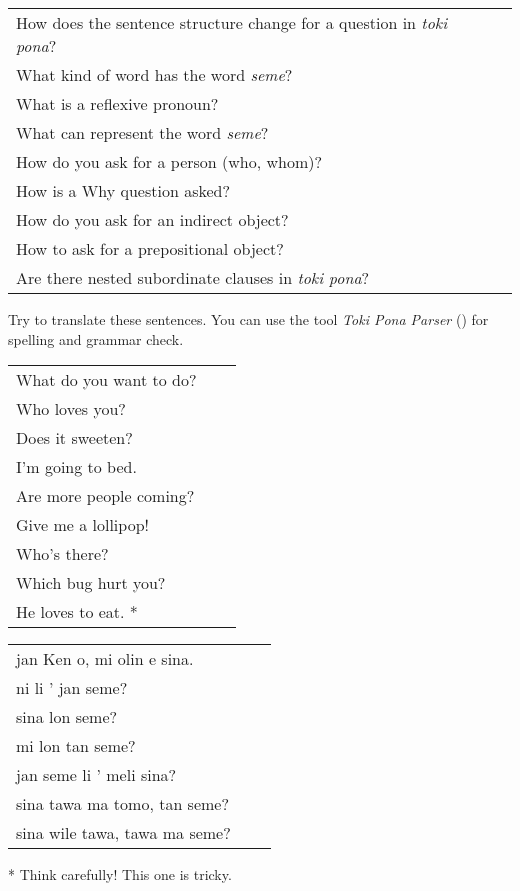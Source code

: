 \begin{supertabular}{p{5,5cm}|ll}
How does the sentence structure change for a question in \textit{toki pona}? &&  \\ %
What kind of word has the word \textit{seme}? &&  \\ %
What is a reflexive pronoun? &&  \\ %
What can represent the word \textit{seme}? &&   \\ %
How do you ask for a person (who, whom)? &&  \\ %
How is a Why question asked? &&  \\ %
How do you ask for an indirect object? &&  \\ %
How to ask for a prepositional object? &&  \\ %
Are there nested subordinate clauses in \textit{toki pona}? && \\ %
\end{supertabular}

Try to translate these sentences. 
You can use the tool \textit{Toki Pona Parser} (\cite{www:rowa:02}) for spelling and grammar check. 

\begin{supertabular}{p{5,5cm}|ll}
What do you want to do? &&   \\ %
Who loves you? &&   \\ %
Does it sweeten?  &&  \\ %
I'm going to bed. && \\  %
Are more people coming? &&  \\  %
Give me a lollipop! && \\   %
Who's there? &&   \\ %
Which bug hurt you?  &&  \\ %
He loves to eat. * &&  \\ %
\end{supertabular}

\begin{supertabular}{p{5,5cm}|ll}
jan Ken o, mi olin e sina.  && \\  %
ni li ' jan seme?  && \\  %
sina lon seme?   && \\  %
mi lon tan seme?  && \\  %
jan seme li ' meli sina?   && \\    %
sina tawa ma tomo, tan seme?    && \\   %
sina wile tawa, tawa  ma seme?      && \\  %
\end{supertabular} 

* Think carefully! This one is tricky. 

